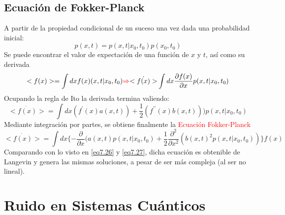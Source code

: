 \documentclass{book}
\begin{document}
\subsection{Ecuación de Fokker-Planck}
A partir de la propiedad condicional de un suceso una vez dada una probabilidad inicial:
\begin{equation}\label{eq7.32}p(x,t)=p(x,t|x_0,t_0)p(x_0,t_0)\end{equation}
Se puede encontrar el valor de expectación de una función de $x$ y $t$, así como su derivada
\begin{equation}\label{eq7.33}<f(x)>=\int dx f(x)(x,t|x_0,t_0) \textcolor{red}{\Rightarrow} \dot{<f(x)>}\int dx \frac{\partial f(x)}{\partial x} p(x,t|x_0,t_0)\end{equation}
Ocupando la regla de Ito la derivada termina valiendo:
\begin{equation}\label{eq7.34}\dot{<f(x)>}=\int dx (f^\prime(x)a(x,t)) +\frac{1}{2}(f^{\prime\prime}(x)b(x,t)))p(x,t|x_0,t_0)\end{equation}
Mediante integración por partes, se obtiene finalmente la \textcolor{red}{Ecuación Fokker-Planck}
\begin{equation}\label{eq7.35}\dot{<f(x)>}=\int dx \{-\frac{\partial}{\partial x}(a(x,t)p(x,t|x_0,t_0)+\frac{1}{2}\frac{\partial^2}{\partial x^2}(b(x,t)^2p(x,t|x_0,t_0))\} f(x)\end{equation}
Comparando con lo visto en \ref{eq7.26} y \ref{eq7.27}, dicha ecuación es obtenible de Langevin y genera las mismas soluciones, a pesar de ser más compleja (al ser no lineal).
\section{Ruido en Sistemas Cuánticos}
\end{document}
